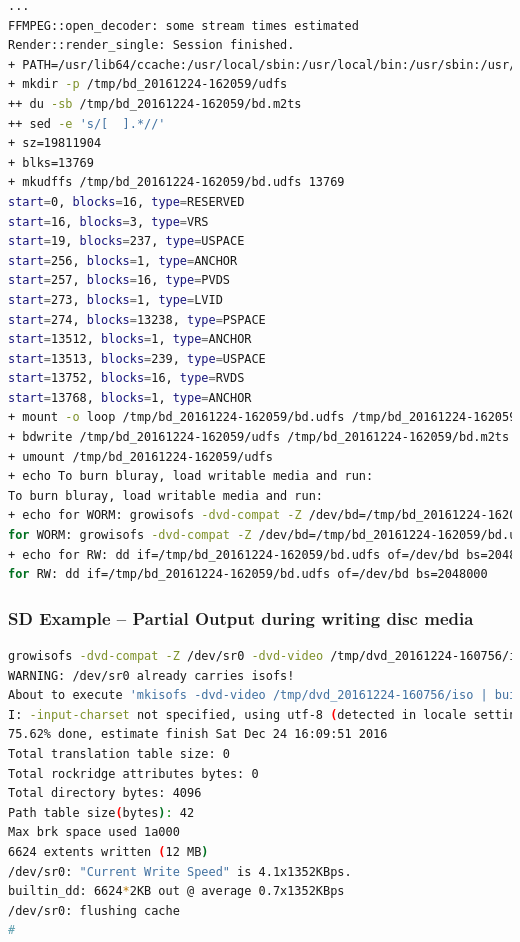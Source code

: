 \begin{lstlisting}[language=bash]
...
FFMPEG::open_decoder: some stream times estimated
Render::render_single: Session finished.
+ PATH=/usr/lib64/ccache:/usr/local/sbin:/usr/local/bin:/usr/sbin:/usr/bin:/root/bin:/mnt0/build5/cinelerra-5.1/bin
+ mkdir -p /tmp/bd_20161224-162059/udfs
++ du -sb /tmp/bd_20161224-162059/bd.m2ts
++ sed -e 's/[  ].*//'
+ sz=19811904
+ blks=13769
+ mkudffs /tmp/bd_20161224-162059/bd.udfs 13769
start=0, blocks=16, type=RESERVED 
start=16, blocks=3, type=VRS 
start=19, blocks=237, type=USPACE 
start=256, blocks=1, type=ANCHOR 
start=257, blocks=16, type=PVDS 
start=273, blocks=1, type=LVID 
start=274, blocks=13238, type=PSPACE 
start=13512, blocks=1, type=ANCHOR 
start=13513, blocks=239, type=USPACE 
start=13752, blocks=16, type=RVDS 
start=13768, blocks=1, type=ANCHOR 
+ mount -o loop /tmp/bd_20161224-162059/bd.udfs /tmp/bd_20161224-162059/udfs
+ bdwrite /tmp/bd_20161224-162059/udfs /tmp/bd_20161224-162059/bd.m2ts
+ umount /tmp/bd_20161224-162059/udfs
+ echo To burn bluray, load writable media and run:
To burn bluray, load writable media and run:
+ echo for WORM: growisofs -dvd-compat -Z /dev/bd=/tmp/bd_20161224-162059/bd.udfs
for WORM: growisofs -dvd-compat -Z /dev/bd=/tmp/bd_20161224-162059/bd.udfs
+ echo for RW: dd if=/tmp/bd_20161224-162059/bd.udfs of=/dev/bd bs=2048000
for RW: dd if=/tmp/bd_20161224-162059/bd.udfs of=/dev/bd bs=2048000
\end{lstlisting}

\subsubsection*{SD Example – Partial Output during writing disc media}
\label{ssub:sd_example_partial_output_writing}

\begin{lstlisting}[language=bash]
growisofs -dvd-compat -Z /dev/sr0 -dvd-video /tmp/dvd_20161224-160756/iso
WARNING: /dev/sr0 already carries isofs!
About to execute 'mkisofs -dvd-video /tmp/dvd_20161224-160756/iso | builtin_dd of=/dev/sr0 obs=32k seek=0'
I: -input-charset not specified, using utf-8 (detected in locale settings)
75.62% done, estimate finish Sat Dec 24 16:09:51 2016
Total translation table size: 0
Total rockridge attributes bytes: 0
Total directory bytes: 4096
Path table size(bytes): 42
Max brk space used 1a000
6624 extents written (12 MB)
/dev/sr0: "Current Write Speed" is 4.1x1352KBps.
builtin_dd: 6624*2KB out @ average 0.7x1352KBps
/dev/sr0: flushing cache
#
\end{lstlisting}

